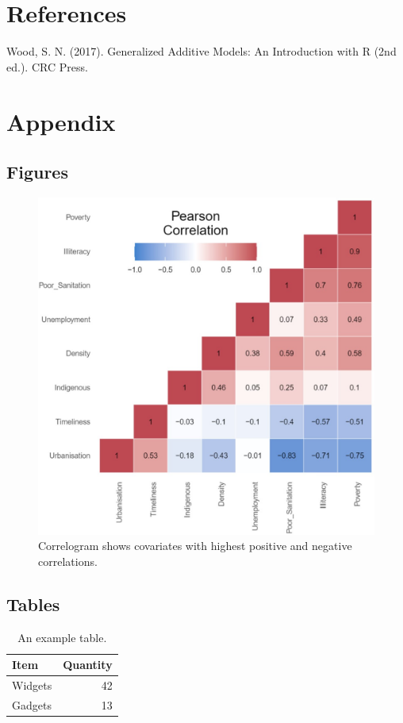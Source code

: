 \documentclass{article}
\begin{document}
\section{References}
Wood, S. N. (2017). Generalized Additive Models: An Introduction with R (2nd ed.). CRC Press.
\section{Appendix}

\subsection{Figures}

\begin{figure}[H]
\centering
\includegraphics[scale=0.5]{pearson_correl.jpg}
\caption{\label{fig:pearson_correl}Correlogram shows covariates with highest positive and negative correlations.}
\end{figure}

\subsection{Tables}

\begin{table}[H]
\centering
\begin{tabular}{l|r}
Item & Quantity \\\hline
Widgets & 42 \\
Gadgets & 13
\end{tabular}
\caption{\label{tab:widgets}An example table.}
\end{table}
\end{document}
